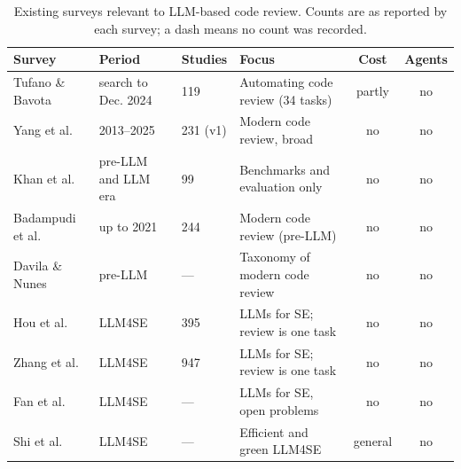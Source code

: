 \begin{table}[t]
\caption{Existing surveys relevant to LLM-based code review. Counts are as reported by each survey; a dash means no count was recorded.}\label{tab:surveys}
\setlength{\tabcolsep}{3pt}
\small
\begin{tabularx}{\textwidth}{@{}p{2.6cm}p{2.5cm}p{1.3cm}Xcc@{}}
\toprule
Survey & Period & Studies & Focus & Cost & Agents \\
\midrule
Tufano \& Bavota~\cite{tufano2025automating} & search to Dec. 2024 & 119 & Automating code review (34 tasks) & partly & no \\
Yang et al.~\cite{yang2025roadmap} & 2013--2025 & 231 (v1) & Modern code review, broad & no & no \\
Khan et al.~\cite{khan2026survey} & pre-LLM and LLM era & 99 & Benchmarks and evaluation only & no & no \\
Badampudi et al.~\cite{badampudi2023modern} & up to 2021 & 244 & Modern code review (pre-LLM) & no & no \\
Davila \& Nunes~\cite{davila2021systematic} & pre-LLM & --- & Taxonomy of modern code review & no & no \\
Hou et al.~\cite{hou2023large} & LLM4SE & 395 & LLMs for SE; review is one task & no & no \\
Zhang et al.~\cite{zhang2023survey} & LLM4SE & 947 & LLMs for SE; review is one task & no & no \\
Fan et al.~\cite{fan2023large} & LLM4SE & --- & LLMs for SE, open problems & no & no \\
Shi et al.~\cite{shi2024efficient} & LLM4SE & --- & Efficient and green LLM4SE & general & no \\
\bottomrule
\end{tabularx}
\end{table}
